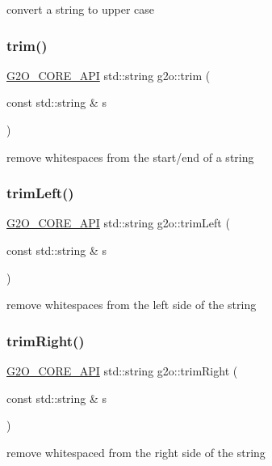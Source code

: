 convert a string to upper case \mbox{\label{group__utils_ga437d185a62afe16a99f27f3b12e108d7}} 
\subsubsection{\texorpdfstring{trim()}{trim()}}
{\footnotesize\ttfamily \mbox{\hyperlink{g2o__core__api_8h_a7a8d7648d6f1e26632566f335751d064}{G2\+O\+\_\+\+C\+O\+R\+E\+\_\+\+A\+PI}} std\+::string g2o\+::trim (\begin{DoxyParamCaption}\item[{const std\+::string \&}]{s }\end{DoxyParamCaption})}

remove whitespaces from the start/end of a string \mbox{\label{group__utils_gad2277aa8d0784f7001f7f27396d59f98}} 
\subsubsection{\texorpdfstring{trim\+Left()}{trimLeft()}}
{\footnotesize\ttfamily \mbox{\hyperlink{g2o__core__api_8h_a7a8d7648d6f1e26632566f335751d064}{G2\+O\+\_\+\+C\+O\+R\+E\+\_\+\+A\+PI}} std\+::string g2o\+::trim\+Left (\begin{DoxyParamCaption}\item[{const std\+::string \&}]{s }\end{DoxyParamCaption})}

remove whitespaces from the left side of the string \mbox{\label{group__utils_ga7305cbf5d345c0e352ac2baa93b7d30a}} 
\subsubsection{\texorpdfstring{trim\+Right()}{trimRight()}}
{\footnotesize\ttfamily \mbox{\hyperlink{g2o__core__api_8h_a7a8d7648d6f1e26632566f335751d064}{G2\+O\+\_\+\+C\+O\+R\+E\+\_\+\+A\+PI}} std\+::string g2o\+::trim\+Right (\begin{DoxyParamCaption}\item[{const std\+::string \&}]{s }\end{DoxyParamCaption})}

remove whitespaced from the right side of the string 